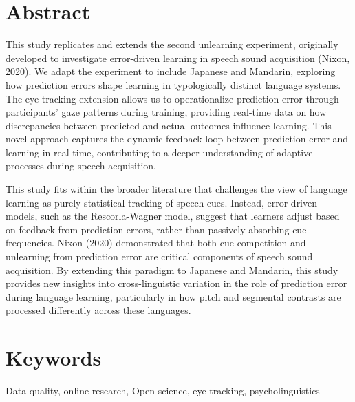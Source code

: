 \section{Abstract}

This study replicates and extends the second unlearning experiment, originally developed to investigate error-driven learning in speech sound acquisition (Nixon, 2020). We adapt the experiment to include Japanese and Mandarin, exploring how prediction errors shape learning in typologically distinct language systems. The eye-tracking extension allows us to operationalize prediction error through participants’ gaze patterns during training, providing real-time data on how discrepancies between predicted and actual outcomes influence learning. This novel approach captures the dynamic feedback loop between prediction error and learning in real-time, contributing to a deeper understanding of adaptive processes during speech acquisition.

This study fits within the broader literature that challenges the view of language learning as purely statistical tracking of speech cues. Instead, error-driven models, such as the Rescorla-Wagner model, suggest that learners adjust based on feedback from prediction errors, rather than passively absorbing cue frequencies. Nixon (2020) demonstrated that both cue competition and unlearning from prediction error are critical components of speech sound acquisition. By extending this paradigm to Japanese and Mandarin, this study provides new insights into cross-linguistic variation in the role of prediction error during language learning, particularly in how pitch and segmental contrasts are processed differently across these languages.


\section{Keywords}
Data quality, online research, Open science, eye-tracking, psycholinguistics
\newpage


